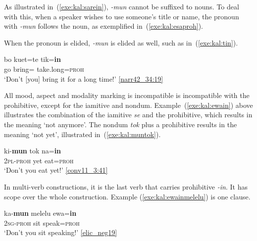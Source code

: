 \documentclass[output=paper,colorlinks,citecolor=brown,draft]{langscibook}
\begin{document}
As illustrated in~(\ref{exe:kal:sarein}), \textit{-mun} cannot be suffixed to nouns. To deal with this, when a speaker wishes to use someone's title or name, the pronoun with \textit{-mun} follows the noun, as exemplified in~(\ref{exe:kal:esaproh}).

\ea 	\label{exe:kal:esaproh}
\z \z 


When the pronoun is elided, \textit{-mun} is elided as well, such as in~(\ref{exe:kal:tin}).


\ea \label{exe:kal:tin}
{\gll bo kuet=te tik=\textbf{in}\\
	go bring={\glte} take.long=\textsc{proh}\\
	\glt `Don't [you] bring it for a long time!' {\href{http://hdl.handle.net/10050/00-0000-0000-0004-1BDD-5}{[narr42\_34:19]}}
}
\z 

All mood, aspect and modality marking is incompatible is incompatible with the prohibitive, except for the iamitive and nondum.
Example~(\ref{exe:kal:ewain}) above illustrates the combination of the iamitive \textit{se} and the prohibitive, which results in the meaning `not anymore'. The nondum \textit{tok} plus a prohibitive results in the meaning `not yet', illustrated in~(\ref{exe:kal:muntok}).

\ea 	\label{exe:kal:muntok}
{\gll ki-\textbf{mun} tok na=\textbf{in}\\
	\textsc{2pl-proh} yet eat=\textsc{proh}\\
	\glt `Don't you eat yet!' {\href{http://hdl.handle.net/10050/00-0000-0000-0004-1BA2-F}{[conv11\_3:41]}}}
\z 


In multi-verb constructions, it is the last verb that carries prohibitive \textit{-in}. It has scope over the whole construction. Example (\ref{exe:kal:ewainmelelu}) is one clause. 

\ea \label{exe:kal:ewainmelelu}
\gll ka-\textbf{mun} melelu ewa=\textbf{in}\\
\textsc{2sg-proh} sit speak=\textsc{proh}\\
\glt `Don't you sit speaking!' {\href{http://hdl.handle.net/10050/00-0000-0000-0004-1C60-A}{[elic\_neg19]}}
\z 
\end{document}
